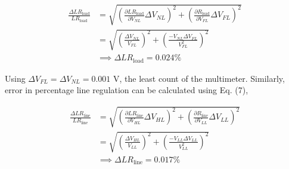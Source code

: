 \begin{align*}
    \frac{\Delta LR_\text{load}}{LR_\text{load}}&= \sqrt{\left(\frac{\partial LR_\text{load}}{\partial V_{NL}}\Delta V_{NL}\right)^2+\left(\frac{\partial R_\text{load}}{\partial V_{FL}}\Delta V_{FL}\right)^2}\\
    &=\sqrt{\left(\frac{\Delta V_{NL}}{V_{FL}}\right)^2+\left(\frac{- V_{NL}\Delta V_{FL}}{V_{FL}^2}\right)^2}\\
    &\implies \Delta LR_\text{load} =0.024\%
\end{align*}

Using $\Delta V_{FL} = \Delta V_{NL} = 0.001$ V, the least count of the multimeter. Similarly, error in percentage line regulation can be calculated using Eq. (7),

\begin{align*}
    \frac{\Delta LR_\text{line}}{LR_\text{line}}&= \sqrt{\left(\frac{\partial LR_\text{line}}{\partial V_{HL}}\Delta V_{HL}\right)^2+\left(\frac{\partial R_\text{line}}{\partial V_{LL}}\Delta V_{LL}\right)^2}\\
    &=\sqrt{\left(\frac{\Delta V_{HL}}{V_{LL}}\right)^2+\left(\frac{- V_{LL}\Delta V_{LL}}{V_{LL}^2}\right)^2}\\
    &\implies \Delta LR_\text{line} =0.017\%
\end{align*}